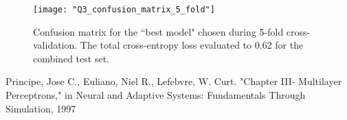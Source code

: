 \documentclass{article}[12 pt]
\begin{document}
\begin{center}
	\begin{figure}[H]
		\centering
		\texttt{[image: "Q3\_confusion\_matrix\_5\_fold"]}
		\caption{Confusion matrix for the ``best model" chosen during 5-fold cross-validation.  The total cross-entropy loss evaluated to 0.62 for the combined test set.}
		\label{fig:Q3_confusion_matrix}
	\end{figure}
\end{center}


\begin{thebibliography}{00}
	Principe, Jose C., Euliano, Niel R., Lefebvre, W. Curt. "Chapter III- Multilayer Perceptrons," in Neural and Adaptive Systems: Fundamentals Through Simulation, 1997
\end{thebibliography}
\end{document}
